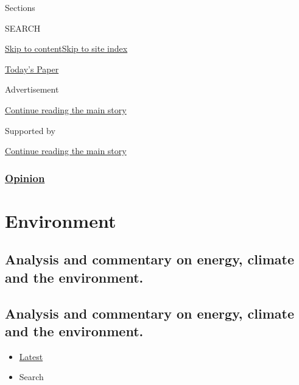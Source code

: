 Sections

SEARCH

\protect\hyperlink{site-content}{Skip to
content}\protect\hyperlink{site-index}{Skip to site index}

\href{https://myaccount.nytimes.com/auth/login?response_type=cookie\&client_id=vi}{}

\href{https://www.nytimes.com/section/todayspaper}{Today's Paper}

Advertisement

\protect\hyperlink{after-top}{Continue reading the main story}

Supported by

\protect\hyperlink{after-sponsor}{Continue reading the main story}

\hypertarget{opinion}{%
\subsubsection{\texorpdfstring{\href{/section/opinion}{Opinion}}{Opinion}}\label{opinion}}

\hypertarget{environment}{%
\section{Environment}\label{environment}}

\hypertarget{analysis-and-commentary-on-energy-climate-and-the-environment}{%
\subsection{Analysis and commentary on energy, climate and the
environment.}\label{analysis-and-commentary-on-energy-climate-and-the-environment}}

\hypertarget{analysis-and-commentary-on-energy-climate-and-the-environment-1}{%
\subsection{Analysis and commentary on energy, climate and the
environment.}\label{analysis-and-commentary-on-energy-climate-and-the-environment-1}}

\begin{itemize}
\tightlist
\item
  \protect\hyperlink{stream-panel}{Latest}
\item
  Search
\end{itemize}

